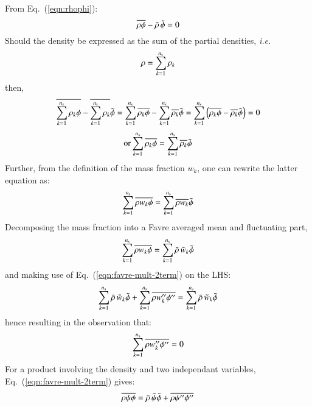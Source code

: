 \documentclass{warpdoc}
\newcommand{\ns}{{{n}_{\rm s}}}
\newcommand{\mfd}{\displaystyle}
\begin{document}
From Eq.\ (\ref{eqn:rhophi}):
%
\begin{equation}
  \overline{\rho  \phi} - \bar{\rho}\,  {\tilde{\phi}} = 0
\end{equation}
%
Should the density be expressed as the sum of the partial densities, \emph{i.e.}
%
\begin{equation}
  \rho=\sum_{k=1}^\ns \rho_k
\end{equation}
%
then,
%
\begin{displaymath}
     \overline{\sum_{k=1}^\ns \rho_k  \phi} - \overline{\sum_{k=1}^\ns \rho_k}  {\wtilde{\phi}}
  =  \sum_{k=1}^\ns \overline{\rho_k  \phi} - \sum_{k=1}^\ns \overline{\rho_k}  {\wtilde{\phi}}
  =  \sum_{k=1}^\ns \left( \overline{\rho_k \phi} -  \overline{\rho_k}  {\wtilde{\phi}}\right)
  =  0
\end{displaymath}
%
%
\begin{equation}
 {\rm or    }\sum_{k=1}^\ns \overline{\rho_k  \phi}
          =  \sum_{k=1}^\ns \overline{\rho_k}  {\wtilde{\phi}}
 \label{eqn:rhophik}
\end{equation}
%
Further, from the definition of the mass fraction $w_k$, one can rewrite the latter
equation as:
%
\begin{equation}
     \sum_{k=1}^\ns \overline{\rho w_k \phi}
  =  \sum_{k=1}^\ns \overline{\rho w_k} {\wtilde{\phi}}
 \label{eqn:rhock}
\end{equation}
%
Decomposing the mass fraction into a Favre averaged mean and fluctuating part,
%
\begin{equation}
     \sum_{k=1}^\ns \overline{\rho w_k \phi}
  =  \sum_{k=1}^\ns \wbar{\rho}\, {\wtilde{w}_k} {\wtilde{\phi}}
 \label{eqn:rhock2}
\end{equation}
%
and making use of Eq.\ (\ref{eqn:favre-mult-2term}) on the LHS:
%
\begin{equation}
     \sum_{k=1}^\ns \wbar{\rho}\, {\wtilde{w}_k} {\wtilde{\phi}}
   + \sum_{k=1}^\ns \overline{\rho w_k^{\prime\prime} \phi^{\prime\prime}}
  =  \sum_{k=1}^\ns \wbar{\rho}\, {\wtilde{w}_k} {\wtilde{\phi}}
 \label{eqn:rhock3}
\end{equation}
%
hence resulting in the observation that:
%
\begin{equation}
  \sum_{k=1}^\ns \overline{\rho w_k^{\prime\prime} \phi^{\prime\prime}} = 0
 \label{eqn:rhock4}
\end{equation}
%
For a product involving the density and two independant variables,
Eq.\ (\ref{eqn:favre-mult-2term}) gives:
%
\begin{displaymath}
  \mfd\overline{\rho \psi \phi}
      = \mfd \wbar{\rho}\, {\wtilde{\psi}} {\wtilde{\phi}}
            +\overline{\rho \psi^{\prime\prime} \phi^{\prime\prime}}
\end{displaymath}
%
\end{document}
